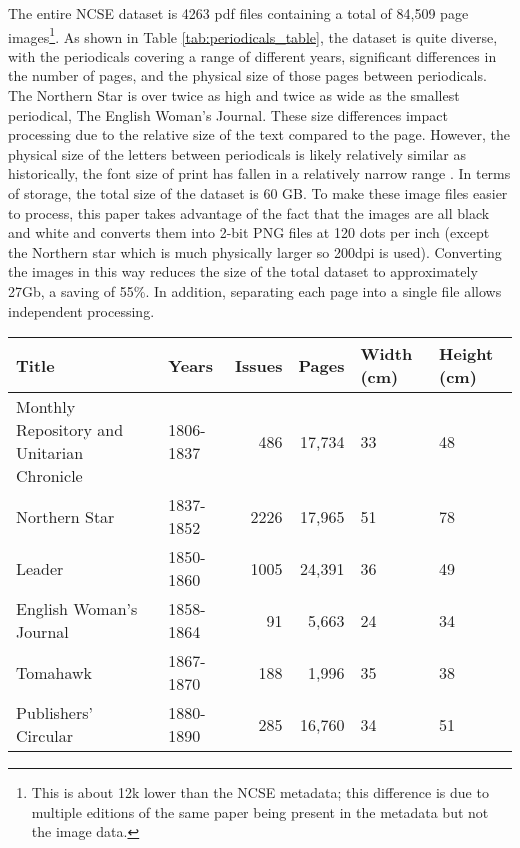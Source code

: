 \documentclass{article} %
\begin{document}
The entire NCSE dataset is 4263 pdf files containing a total of 84,509 page images\footnote{This is about 12k lower than the NCSE metadata; this difference is due to multiple editions of the same paper being present in the metadata but not the image data.}.
As shown in Table \ref{tab:periodicals_table}, the dataset is quite diverse, with the periodicals covering a range of different years, significant differences in the number of pages,  and the physical size of those pages between periodicals. The Northern Star is over twice as high and twice as wide as the smallest periodical, The English Woman's Journal. These size differences impact processing due to the relative size of the text compared to the page. However, the physical size of the letters between periodicals is likely relatively similar as historically, the font size of print has fallen in a relatively narrow range \cite{legge_does_2011}. In terms of storage, the total size of the dataset is 60 GB. To make these image files easier to process, this paper takes advantage of the fact that the images are all black and white and converts them into 2-bit PNG files at 120 dots per inch (except the Northern star which is much physically larger so 200dpi is used). Converting the images in this way reduces the size of the total dataset to approximately 27Gb, a saving of 55\%. In addition, separating each page into a single file allows independent processing.

\begin{table*}
\caption{The newspapers and periodicals of the NCSE and their key information}
\label{tab:periodicals_table}
\begin{tabular}{p{4cm}lrrp{1cm}p{1cm}}
\toprule
Title & Years & Issues & Pages  & Width (cm)  & Height (cm)\\
\midrule
Monthly Repository and Unitarian Chronicle & 1806-1837 & 486 & 17,734  & 33 & 48 \\
Northern Star & 1837-1852 & 2226 & 17,965  & 51 & 78\\
Leader & 1850-1860 & 1005 & 24,391 & 36 & 49\\
English Woman’s Journal & 1858-1864 & 91 & 5,663 & 24 & 34 \\
Tomahawk & 1867-1870 & 188 & 1,996 & 35 & 38\\
Publishers’ Circular & 1880-1890 & 285 & 16,760 & 34 & 51 \\
\bottomrule
\end{tabular}
\end{table*}

\FloatBarrier
\end{document}
